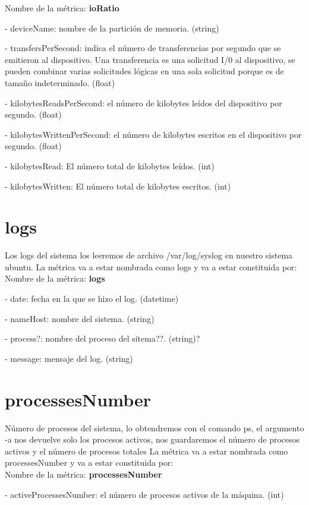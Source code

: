 \documentclass[ spanish, a4paper, 12pt, twoside]{report}
\begin{document}
Nombre de la métrica: \textbf{ioRatio}

\hyp{} deviceName: nombre de la partición de memoria. (string)

\hyp{} transfersPerSecond: indica el número de transferencias por segundo que se emitieron al dispositivo. 
Una transferencia es una solicitud I/0 al dispositivo, se pueden combinar varias solicitudes lógicas en una sola solicitud 
porque es de tamaño indeterminado. (float)

\hyp{} kilobytesReadsPerSecond: el número de kilobytes leídos del dispositivo por segundo. (float)

\hyp{} kilobytesWrittenPerSecond: el número de kilobytes escritos en el dispositivo por segundo. (float)

\hyp{} kilobytesRead: El número total de kilobytes leídos. (int)

\hyp{} kilobytesWritten: El número total de kilobytes escritos. (int)

\section{logs}
Los logs del sistema los leeremos de archivo /var/log/syslog en nuestro sistema ubuntu.
La métrica va a estar nombrada como logs y va a estar constituida por:\\

Nombre de la métrica: \textbf{logs}

\hyp{} date: fecha en la que se hizo el log. (datetime)

\hyp{} nameHost: nombre del sistema. (string)

\hyp{} process?: nombre del proceso del sitema??. (string)?

\hyp{} message: mensaje del log. (string)

\section{processesNumber}
Número de procesos del sistema, lo obtendremos con el comando ps, el argumento -a nos devuelve solo los 
procesos activos, nos guardaremos el número de procesos activos y el número de procesos totales
La métrica va a estar nombrada como processesNumber y va a estar constituida por:\\
 
Nombre de la métrica: \textbf{processesNumber}
 
\hyp{} activeProcessesNumber: el número de procesos activos de la máquina. (int)
 
\end{document}

